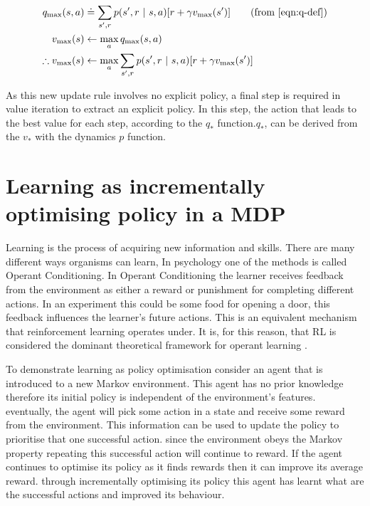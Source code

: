 \documentclass[]{final_report}
\begin{document}
\begin{align}
  q_{\text{max}}(s,a)          & \doteq \sum_{s',r}p(s',r\ |\ s, a)[r + \gamma v_{\text{max}}(s')] \tag{from \ref{eqn:q-def}} \\
  v_{\text{max}}(s)            & \leftarrow  \max_a q_{\text{max}}(s,a) \label{eqn:v-update}                                  \\
  \therefore v_{\text{max}}(s) & \leftarrow  \max_a \sum_{s',r}p(s',r\ |\ s, a)[r + \gamma v_{\text{max}}(s')]
\end{align}


As this new update rule involves no explicit policy, a final step is required in value iteration to extract an explicit policy. In this step, the action that leads to the best value for each step, according to the $q_\ast$ function.$q_\ast$, can be derived from the $v_\ast$ with the dynamics $p$ function.


\section{Learning as incrementally optimising policy in a MDP}

Learning is the process of acquiring new information and skills. There are many different ways organisms can learn, In psychology one of the methods is called Operant Conditioning. In Operant Conditioning the learner receives feedback from the environment as either a reward or punishment for completing different actions\cite{staddon2003operant}. In an experiment this could be some food for opening a door, this feedback influences the learner's future actions. This is an equivalent mechanism that reinforcement learning operates under. It is, for this reason, that RL is considered the dominant theoretical framework for operant learning \cite{shteingart2014reinforcement}. 

To demonstrate learning as policy optimisation consider an agent that is introduced to a new Markov environment. This agent has no prior knowledge therefore its initial policy is independent of the environment's features. eventually, the agent will pick some action in a state and receive some reward from the environment. This information can be used to update the policy to prioritise that one successful action. since the environment obeys the Markov property repeating this successful action will continue to reward. If the agent continues to optimise its policy as it finds rewards then it can improve its average reward. through incrementally optimising its policy this agent has learnt what are the successful actions and improved its behaviour.
\end{document}
